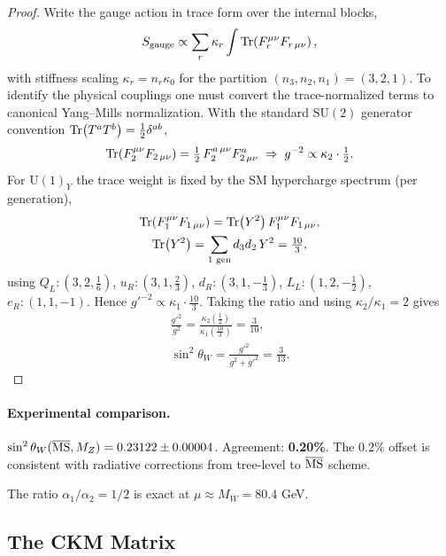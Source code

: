 \begin{proof}
Write the gauge action in trace form over the internal blocks,
\[
S_{\rm gauge}\propto \sum_r \kappa_r\int \Tr\!\left(F_r^{\mu\nu}F_{r\,\mu\nu}\right),
\]
with stiffness scaling $\kappa_r=n_r\kappa_0$ for the partition $(n_3,n_2,n_1)=(3,2,1)$.
To identify the physical couplings one must convert the trace-normalized terms
to canonical Yang--Mills normalization.
With the standard $\mathrm{SU}(2)$ generator convention $\Tr(T^aT^b)=\tfrac12\delta^{ab}$,
\[
\Tr(F_2^{\mu\nu}F_{2\,\mu\nu})=\tfrac12\,F_2^{a\,\mu\nu}F^a_{2\,\mu\nu}
\;\Rightarrow\; g^{-2}\propto \kappa_2\cdot\tfrac12.
\]
For $\mathrm{U}(1)_Y$ the trace weight is fixed by the SM hypercharge spectrum (per generation),
\begin{gather*}
\Tr(F_1^{\mu\nu}F_{1\,\mu\nu})=\Tr(Y^2)\,F_1^{\mu\nu}F_{1\,\mu\nu}, \\
\Tr(Y^2)=\sum_{\text{1 gen}} d_3 d_2\,Y^2=\tfrac{10}{3},
\end{gather*}
using $Q_L\!:\!(3,2,\tfrac16)$, $u_R\!:\!(3,1,\tfrac23)$, $d_R\!:\!(3,1,-\tfrac13)$,
$L_L\!:\!(1,2,-\tfrac12)$, $e_R\!:\!(1,1,-1)$.
Hence $g'^{-2}\propto \kappa_1\cdot\tfrac{10}{3}$.
Taking the ratio and using $\kappa_2/\kappa_1=2$ gives
\begin{gather*}
\frac{g'^2}{g^2}
=\frac{\kappa_2(\tfrac12)}{\kappa_1(\tfrac{10}{3})}
=\frac{3}{10}, \\[4pt]
\sin^2\theta_W=\frac{g'^2}{g^2+g'^2}=\frac{3}{13}.
\end{gather*}
\end{proof}


\paragraph{Experimental comparison.}
$\sin^2\theta_W(\overline{\rm MS}, M_Z) = 0.23122 \pm 0.00004$.
Agreement: \textbf{0.20\%}. The 0.2\% offset is consistent with radiative 
corrections from tree-level to $\overline{\rm MS}$ scheme.

\begin{corollary}
The ratio $\alpha_1/\alpha_2 = 1/2$ is exact at $\mu \approx M_W = 80.4$ GeV.
\end{corollary}

\subsection{The CKM Matrix}\label{app:ckm-matrix}

